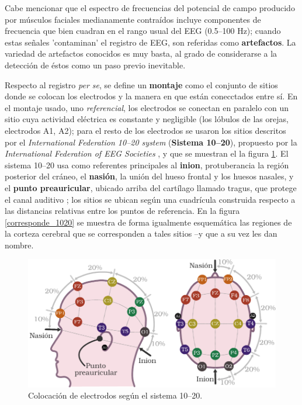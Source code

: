 Cabe mencionar que el espectro de frecuencias del potencial de campo producido por m\'usculos 
faciales medianamente contra\'idos incluye componentes de frecuencia que bien cuadran en el rango 
usual del EEG (0.5--100 Hz); cuando estas se\~nales 'contaminan' el registro de EEG, son referidas
como \textbf{artefactos}. La variedad de artefactos conocidos es muy basta, al grado de
considerarse a la detecci\'on de \'estos como un paso previo inevitable.

Respecto al registro \textit{per se}, se define un \textbf{montaje} como
el conjunto de sitios donde se colocan los electrodos y la manera en
que están conecctados entre sí.
En el montaje usado, uno \textit{referencial}, los electrodos se conectan en paralelo con un 
sitio cuya actividad eléctrica es constante y negligible (los lóbulos de las orejas,
electrodos A1, A2); para el resto de los electrodos se usaron los sitios descritos por el
\textit{International Federation 10--20 system} (\textbf{Sistema 10--20}), propuesto por la 
\textit{International Federation of EEG Societies} \cite{Jasper58,AASM07},
y que se muestran el la figura \ref{img1020}.
El sistema 10--20 usa como referentes principales al \textbf{inion}, protuberancia la región posterior 
del cráneo, el \textbf{nasión}, la unión del hueso frontal y los huesos nasales, y el 
\textbf{punto preauricular}, ubicado arriba del cartílago llamado tragus, que protege el canal 
auditivo \cite{Butkov07}; los sitios se ubican según una cuadrícula construida respecto a las
distancias relativas entre los puntos de referencia.
En la figura \ref{corresponde_1020} se muestra de
forma igualmente esquemática las regiones de la corteza cerebral que se corresponden a tales 
sitios --y que a su vez les dan nombre.

\begin{figure}
\centering
\includegraphics[width=\linewidth]{./img_diagramas/cabeza_proporcionada_color.pdf} 
\caption{Colocación de electrodos según el sistema 10--20.
}
\label{img1020}
\end{figure}

